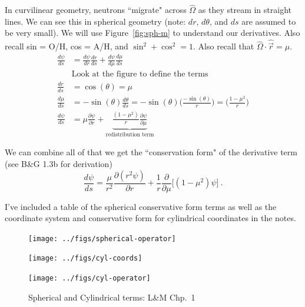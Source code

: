\documentclass[12pt]{article}
\newcommand{\vOmega}{\ensuremath{\hat{\Omega}}}
\begin{document}
In curvilinear geometry, neutrons ``migrate" across $\vOmega$ as they stream in straight lines. 
We can see this in spherical geometry (note: $dr$, $d\theta$, and $ds$ are assumed to be very small). We will use Figure~\ref{fig:sph-m} to understand our derivatives. Also recall sin = O/H, cos = A/H, and $\sin^2 + \cos^2 = 1$. Also recall that $\vOmega \cdot \hat{\vec{r}} = \mu$.
%
\begin{align*}
\frac{d \psi}{ds} &= \frac{d \psi}{dr} \frac{dr}{ds} + \frac{d\psi}{d\mu} \frac{d\mu}{ds} \\
&\text{Look at the figure to define the terms}\\
\frac{dr}{ds} &= \cos(\theta) = \mu \\
%
\frac{d \mu}{ds} &= -\sin(\theta) \frac{d \theta}{ds} = -\sin(\theta) \biggl(\frac{-\sin(\theta)}{r} \biggr) = \biggl(\frac{1 - \mu^2}{r} \biggr) \\
%
\frac{d\psi}{ds} &= \mu \frac{\partial \psi}{\partial r} + \underbrace{\frac{(1 - \mu^2)}{r}\frac{\partial \psi}{\partial \mu}}_{\text{redistribution term}}
\end{align*}

We can combine all of that we get the ``conservation form" of the derivative term (see B\&G 1.3b for derivation)
\[\frac{d\psi}{ds} = \frac{\mu}{r^2} \frac{\partial(r^2 \psi)}{\partial r} + \frac{1}{r} \frac{\partial}{\partial \mu}\bigl[(1 - \mu^2) \psi \bigr] \:. \]

I've included a table of the spherical conservative form terms as well as the coordinate system and conservative form for cylindrical coordinates in the notes.
%
\begin{figure}[h!] 
    \label{fig:sph-op}
    \begin{center}
    \texttt{[image: ../figs/spherical-operator]}
    \end{center}    
    \begin{center}
    \texttt{[image: ../figs/cyl-coords]}
    \end{center}    
    \label{fig:cyl-coord}
    \begin{center}
    \texttt{[image: ../figs/cyl-operator]}
    \end{center}    
    \caption{Spherical and Cylindrical terms: L\&M Chp.\ 1}
\end{figure}
\end{document}
